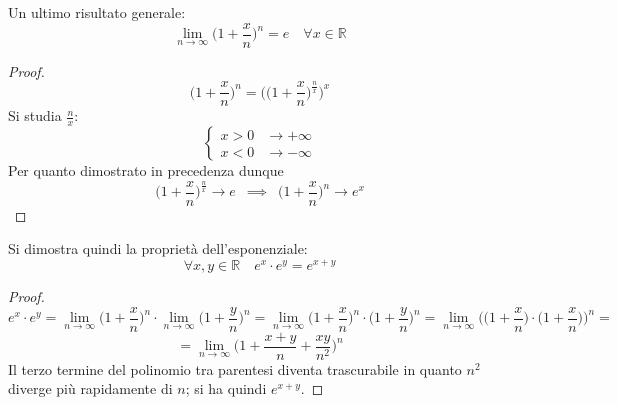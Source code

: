\documentclass[10pt]{article}
\theoremstyle{plain}
\begin{document}
Un ultimo risultato generale:
\[\lim \limits_{n \rightarrow \infty} \bigg(1 + \frac{x}{n}\bigg)^{n} = e \quad \forall x \in \mathbb{R}\]
\begin{proof}
    \[\bigg(1 + \frac{x}{n}\bigg)^{n} = \Bigg(\bigg(1 + \frac{x}{n}\bigg)^{\frac{n}{x}}\Bigg)^x\]
    Si studia $\frac{n}{x}$:
    \[\begin{cases}
        x > 0 & \rightarrow +\infty\\
        x < 0 & \rightarrow - \infty
    \end{cases}\]
    Per quanto dimostrato in precedenza dunque 
    \[\bigg(1 + \frac{x}{n}\bigg)^{\frac{n}{x}} \rightarrow e \enspace \implies \enspace \bigg(1 + \frac{x}{n}\bigg)^{n} \rightarrow e^x\]
\end{proof}
Si dimostra quindi la proprietà dell'esponenziale:
\[\forall x, y \in \mathbb{R} \quad e^x \cdot e^y = e^{x+y}\]
\begin{proof}
    \[e^x \cdot e^y = \lim \limits_{n \rightarrow \infty} \bigg(1 + \frac{x}{n}\bigg)^{n} \cdot \lim \limits_{n \rightarrow \infty} \bigg(1 + \frac{y}{n}\bigg)^{n} = \lim \limits_{n \rightarrow \infty} \bigg(1 + \frac{x}{n}\bigg)^{n} \cdot \bigg(1 + \frac{y}{n}\bigg)^{n} = \lim \limits_{n \rightarrow \infty} \Bigg(\bigg(1 + \frac{x}{n}\bigg) \cdot \bigg(1 + \frac{x}{n}\bigg) \Bigg)^{n} =\]
    \[= \lim \limits_{n \rightarrow \infty} \bigg(1 + \frac{x+y}{n} + \frac{xy}{n^2}\bigg)^{n}\]
    Il terzo termine del polinomio tra parentesi diventa trascurabile in quanto $n^2$ diverge più rapidamente di $n$; si ha quindi $e^{x+y}$.

    
\end{proof}
\end{document}
